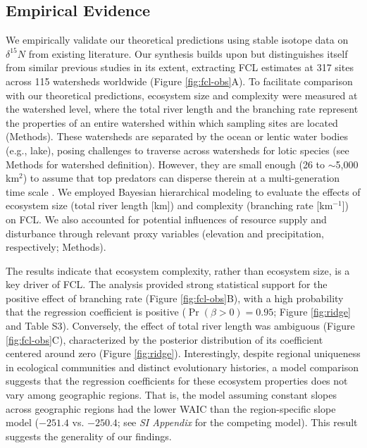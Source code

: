 \documentclass[11pt, class=article, crop=false]{standalone}
\begin{document}
\subsection{Empirical Evidence}

We empirically validate our theoretical predictions using stable isotope data on $\delta^{15}N$ from existing literature.
Our synthesis builds upon but distinguishes itself from similar previous studies in its extent, extracting FCL estimates at 317 sites across 115 watersheds worldwide (Figure \ref{fig:fcl-obs}A).
To facilitate comparison with our theoretical predictions, ecosystem size and complexity were measured at the watershed level, where the total river length and the branching rate represent the properties of an entire watershed within which sampling sites are located (Methods).
These watersheds are separated by the ocean or lentic water bodies (e.g., lake), posing challenges to traverse across watersheds for lotic species (see Methods for watershed definition).
However, they are small enough (26 to $\sim$5,000 km$^2$) to assume that top predators can disperse therein at a multi-generation time scale \citep{comte_fish_2018}.
We employed Bayesian hierarchical modeling to evaluate the effects of ecosystem size (total river length [km]) and complexity (branching rate [km$^{-1}$]) on FCL.
We also accounted for potential influences of resource supply and disturbance through relevant proxy variables (elevation and precipitation, respectively; Methods).

The results indicate that ecosystem complexity, rather than ecosystem size, is a key driver of FCL.
The analysis provided strong statistical support for the positive effect of branching rate (Figure \ref{fig:fcl-obs}B), with a high probability that the regression coefficient is positive ($\Pr(\beta > 0) = 0.95$; Figure \ref{fig:ridge} and Table S3).
Conversely, the effect of total river length was ambiguous (Figure \ref{fig:fcl-obs}C), characterized by the posterior distribution of its coefficient centered around zero (Figure \ref{fig:ridge}).
Interestingly, despite regional uniqueness in ecological communities and distinct evolutionary histories, a model comparison suggests that the regression coefficients for these ecosystem properties does not vary among geographic regions.
That is, the model assuming constant slopes across geographic regions had the lower WAIC \citep{watanabe_asymptotic_2010} than the region-specific slope model ($-251.4$ vs. $-250.4$; see \textit{SI Appendix} for the competing model).
This result suggests the generality of our findings. 
\end{document}
